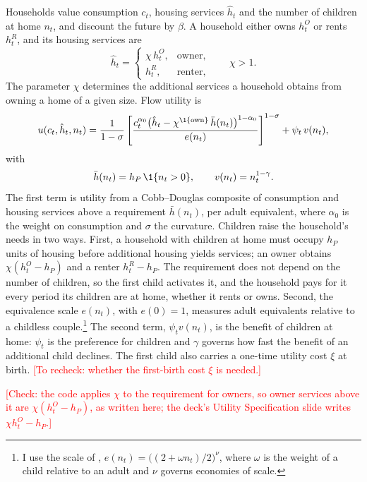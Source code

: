Households value consumption $c_t$, housing services $\hat h_t$ and the
number of children at home $n_t$, and discount the future by $\beta$. A
household either owns $h^O_t$ or rents $h^R_t$, and its housing services are
\begin{equation*}
 \hat h_t=\begin{cases}\chi\,h^O_t, & \text{owner},\\ h^R_t, & \text{renter},\end{cases}
 \qquad \chi>1 .
\end{equation*}
The parameter $\chi$ determines the additional services a household obtains
from owning a home of a given size. Flow utility is
\begin{equation}
 u(c_t,\hat h_t,n_t)=\frac{1}{1-\sigma}\left[\frac{c_t^{\alpha_0}\bigl(\hat h_t-\chi^{\1\{\text{own}\}}\,\bar h(n_t)\bigr)^{1-\alpha_0}}{e(n_t)}\right]^{1-\sigma}+\psi_t\,v(n_t),
 \label{eq:m-utility}
\end{equation}
with
\begin{equation*}
 \bar h(n_t)=h_P\,\1\{n_t>0\},\qquad v(n_t)=n_t^{1-\gamma}.
\end{equation*}
The first term is utility from a Cobb--Douglas composite of consumption and
housing services above a requirement $\bar h(n_t)$, per adult equivalent,
where $\alpha_0$ is the weight on consumption and $\sigma$ the curvature.
Children raise the household's needs in two ways. First, a household with
children at home must occupy $h_P$ units of housing before additional housing
yields services; an owner obtains $\chi(h^O_t-h_P)$ and a renter $h^R_t-h_P$.
The requirement does not depend on the number of children, so the first
child activates it, and the household pays for it every period its children
are at home, whether it rents or owns. Second, the equivalence scale
$e(n_t)$, with $e(0)=1$, measures adult equivalents relative to a childless
couple.\footnote{I use the scale of
\citet{scholzSeshadriKhitatrakunSaving2006},
$e(n_t)=\bigl((2+\omega n_t)/2\bigr)^{\nu}$, where $\omega$ is the weight of
a child relative to an adult and $\nu$ governs economies of scale.} The second
term, $\psi_t v(n_t)$, is the benefit of children at home: $\psi_t$ is the
preference for children and $\gamma$ governs how fast the benefit of an
additional child declines. The first child also carries a one-time utility
cost $\xi$ at birth. \textcolor{red}{[To recheck: whether the first-birth
cost $\xi$ is needed.]}

\textcolor{red}{[Check: the code applies $\chi$ to the requirement for owners, so owner services above it are $\chi(h^O_t-h_P)$, as written here; the deck's Utility Specification slide writes $\chi h^O_t-h_P$.]}

